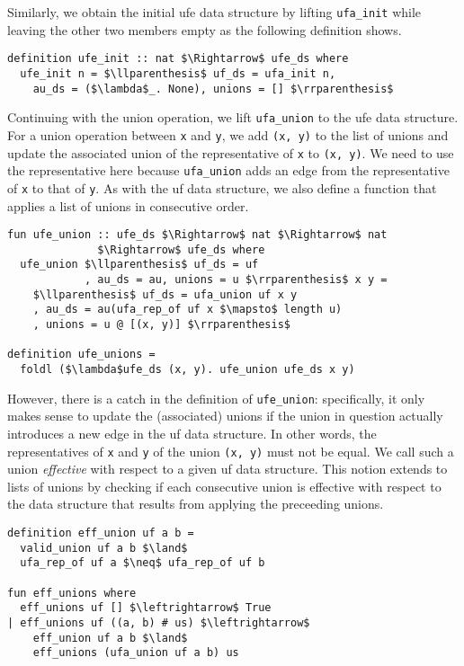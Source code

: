 \documentclass[
  sigplan,
  10pt,
  anonymous,
  review,
  ]{acmart}
\begin{document}
Similarly, we obtain the initial \acrshort{ufe} data structure by lifting \lstinline|ufa_init| while leaving the other two members empty as the following definition shows.
\begin{lstlisting}
definition ufe_init :: nat $\Rightarrow$ ufe_ds where
  ufe_init n = $\llparenthesis$ uf_ds = ufa_init n,
    au_ds = ($\lambda$_. None), unions = [] $\rrparenthesis$
\end{lstlisting}
Continuing with the union operation, we lift \lstinline|ufa_union| to the \acrshort{ufe} data structure.
For a union operation between \lstinline|x| and \lstinline|y|, we add \lstinline|(x, y)| to the list of unions and update the associated union of the representative of \lstinline|x| to \lstinline|(x, y)|.
We need to use the representative here because \lstinline|ufa_union| adds an edge from the representative of \lstinline|x| to that of \lstinline|y|.
As with the \acrshort{uf} data structure, we also define a function that applies a list of unions in consecutive order.
\begin{lstlisting}
fun ufe_union :: ufe_ds $\Rightarrow$ nat $\Rightarrow$ nat
              $\Rightarrow$ ufe_ds where
  ufe_union $\llparenthesis$ uf_ds = uf
            , au_ds = au, unions = u $\rrparenthesis$ x y =
    $\llparenthesis$ uf_ds = ufa_union uf x y
    , au_ds = au(ufa_rep_of uf x $\mapsto$ length u)
    , unions = u @ [(x, y)] $\rrparenthesis$

definition ufe_unions = 
  foldl ($\lambda$ufe_ds (x, y). ufe_union ufe_ds x y)
\end{lstlisting}
However, there is a catch in the definition of \lstinline|ufe_union|:
specifically, it only makes sense to update the (associated) unions if the union in question actually introduces a new edge in the \acrshort{uf} data structure.
In other words, the representatives of \lstinline|x| and \lstinline|y| of the union \lstinline|(x, y)| must not be equal.
We call such a union \emph{effective} with respect to a given \acrshort{uf} data structure.
This notion extends to lists of unions by checking if each consecutive union is effective with respect to the data structure that results from applying the preceeding unions.
\begin{lstlisting}
definition eff_union uf a b =
  valid_union uf a b $\land$
  ufa_rep_of uf a $\neq$ ufa_rep_of uf b

fun eff_unions where
  eff_unions uf [] $\leftrightarrow$ True
| eff_unions uf ((a, b) # us) $\leftrightarrow$
    eff_union uf a b $\land$
    eff_unions (ufa_union uf a b) us
\end{lstlisting}
\end{document}
